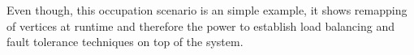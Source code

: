Even though, this occupation scenario is an simple example, it
shows remapping of vertices at runtime and therefore the power
to establish load balancing and fault tolerance techniques on
top of the system.

\cleardoublepage


